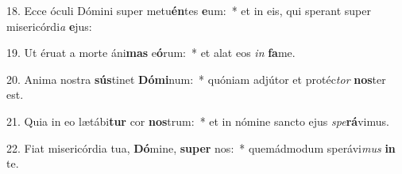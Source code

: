 18. Ecce óculi Dómini super metu\textbf{én}tes \textbf{e}um:~*  et in eis, qui sperant super misericórdi\textit{a} \textbf{e}jus:\

19. Ut éruat a morte áni\textbf{mas} e\textbf{ó}rum:~*  et alat eos \textit{in} \textbf{fa}me.\

20. Anima nostra \textbf{sús}tinet \textbf{Dó}\textbf{mi}num:~*  quóniam adjútor et protéc\textit{tor} \textbf{nos}ter est.\

21. Quia in eo lætábi\textbf{tur} cor \textbf{nos}trum:~*  et in nómine sancto ejus \textit{spe}\textbf{rá}vimus.\

22. Fiat misericórdia tua, \textbf{Dó}mine, \textbf{su}\textbf{per} nos:~*  quemádmodum sperávi\textit{mus} \textbf{in} te.\

